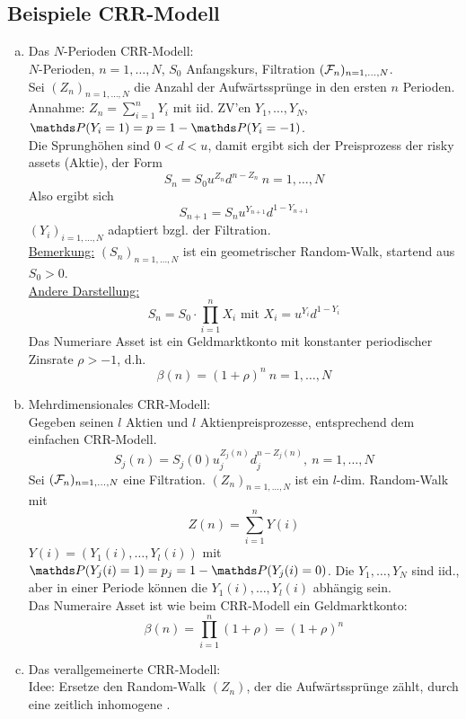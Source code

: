 \subsection{Beispiele CRR-Modell}
\label{sub:bsp_crr}
\begin{enumerate}[(a)]
	\item Das $N$-Perioden CRR-Modell:\\
	$N$-Perioden, $n=1,\dots,N$, $S_0$ Anfangskurs, Filtration $(\mathcal{F}_n)_{n=1,\dots,N}$.\\
	Sei $(Z_n)_{n=1,\dots,N}$ die Anzahl der Aufwärtssprünge in den ersten $n$ Perioden.\\
	Annahme: $Z_n=\sum_{i=1}^{n}Y_i$ mit iid. ZV'en $Y_1,\dots,Y_N$, $\Pw(Y_i=1)=p=1-\Pw(Y_i=-1)$.\\
	Die Sprunghöhen sind $0<d<u$, damit ergibt sich der Preisprozess der risky assets (Aktie), der Form 
	\[
	S_n=S_0u^{Z_n}d^{n-Z_n}~ n=1,\dots,N	
	\]
	Also ergibt sich
	\[
	S_{n+1}=S_nu^{Y_{n+1}}d^{1-Y_{n+1}}
	\]
	$(Y_i)_{i=1,\dots,N}$ adaptiert bzgl. der Filtration.\\
	\uline{Bemerkung:} $(S_n)_{n=1,\dots,N}$ ist ein geometrischer Random-Walk, startend aus $S_0>0$.\\
	\uline{Andere Darstellung:}
	\[
	S_n=S_0\cdot \prod_{i=1}^{n}X_i \text{ mit } X_i=u^{Y_i}d^{1-Y_i}
	\]
	Das Numeriare Asset ist ein Geldmarktkonto mit konstanter periodischer Zinsrate $\rho>-1$, d.h.
	\[
	\beta(n)=(1+\rho)^n ~ n=1,\dots,N
	\]
	\item Mehrdimensionales CRR-Modell:\\
	Gegeben seinen $l$ Aktien und $l$ Aktienpreisprozesse, entsprechend dem einfachen CRR-Modell.
	\[
	S_j(n) = S_j(0)u_j^{Z_j(n)}d_j^{n-Z_j(n)},~ n=1,\dots, N
	\]
	Sei $(\mathcal{F}_n)_{n=1,\dots,N}$ eine Filtration. $(Z_n)_{n=1,\dots,N}$ ist ein $l$-dim. Random-Walk mit 
	\[
	Z(n)=\sum_{i=1}^{n}Y(i)
	\]
	$Y(i)=(Y_1(i),\dots,Y_l(i))$ mit $\Pw(Y_j(i)=1)=p_j=1-\Pw(Y_j(i)=0)$. 
	Die $Y_1,\dots,Y_N$ sind iid., aber in einer Periode können die $Y_1(i),\dots,Y_l(i)$ abhängig sein.\\
	Das Numeraire Asset ist wie beim CRR-Modell ein Geldmarktkonto:
	\[
	\beta(n)=\prod_{i=1}^{n}(1+\rho)=(1+\rho)^n
	\]
	\item Das verallgemeinerte CRR-Modell:\\
	Idee: Ersetze den Random-Walk $(Z_n)$, der die Aufwärtssprünge zählt, durch eine zeitlich inhomogene .\\

\end{enumerate}
